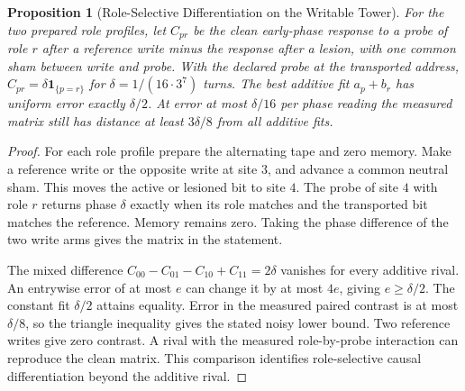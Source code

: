 \documentclass[11pt,a4paper]{article}
\newtheorem{proposition}[theorem]{Proposition}
\theoremstyle{definition}
\begin{document}
\begin{proposition}[Role-Selective Differentiation on the Writable Tower]\label{prop:bridge-tower-differentiation}
For the two prepared role profiles, let $C_{pr}$ be the clean early-phase response to a probe of role $r$ after a reference write minus the response after a lesion, with one common sham between write and probe. With the declared probe at the transported address, $C_{pr}=\delta\mathbf 1_{\{p=r\}}$ for $\delta=1/(16\cdot3^7)$ turns. The best additive fit $a_p+b_r$ has uniform error exactly $\delta/2$. At error at most $\delta/16$ per phase reading the measured matrix still has distance at least $3\delta/8$ from all additive fits.
\end{proposition}
\begin{proof}
For each role profile prepare the alternating tape and zero memory. Make a reference write or the opposite write at site $3$, and advance a common neutral sham. This moves the active or lesioned bit to site $4$. The probe of site $4$ with role $r$ returns phase $\delta$ exactly when its role matches and the transported bit matches the reference. Memory remains zero. Taking the phase difference of the two write arms gives the matrix in the statement.

The mixed difference $C_{00}-C_{01}-C_{10}+C_{11}=2\delta$ vanishes for every additive rival. An entrywise error of at most $e$ can change it by at most $4e$, giving $e\ge\delta/2$. The constant fit $\delta/2$ attains equality. Error in the measured paired contrast is at most $\delta/8$, so the triangle inequality gives the stated noisy lower bound. Two reference writes give zero contrast. A rival with the measured role-by-probe interaction can reproduce the clean matrix. This comparison identifies role-selective causal differentiation beyond the additive rival.
\end{proof}
\end{document}
